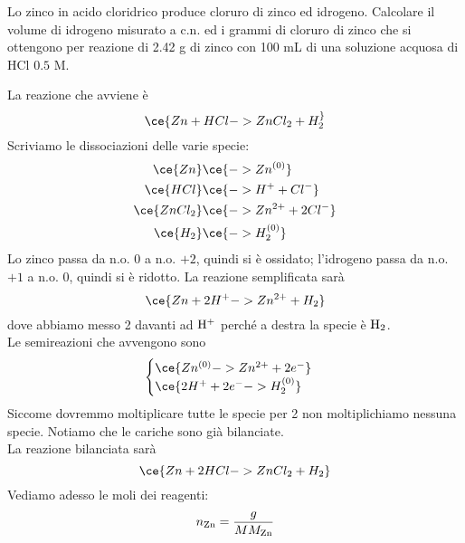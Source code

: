 \begin{esercizio}
    Lo zinco in acido cloridrico produce cloruro di zinco ed idrogeno. Calcolare il volume di idrogeno misurato a c.n. ed i grammi di cloruro di zinco che si ottengono per reazione di 2.42 g di zinco con 100 mL di una soluzione acquosa di HCl $0.5$ M.
\end{esercizio}
\begin{soluzione}
    La reazione che avviene è
    \begin{equation*}
        \ce{Zn + HCl -> ZnCl_2 + H_2 ^}
    \end{equation*}
    Scriviamo le dissociazioni delle varie specie:
    \begin{equation*}
        \begin{split}
            \ce{Zn} & \ce{-> Zn^{(0)}}
            \\
            \ce{HCl} & \ce{-> H^+ + Cl^-}
            \\
            \ce{ZnCl_2} & \ce{-> Zn^{2+} + 2Cl^-}
            \\
            \ce{H_2} & \ce{-> H_2^{(0)}}
        \end{split}
    \end{equation*}
    Lo zinco passa da n.o. $0$ a n.o. $+2$, quindi si è ossidato; l'idrogeno passa da n.o. $+1$ a n.o. $0$, quindi si è ridotto. La reazione semplificata sarà
    \begin{equation*}
        \ce{Zn + 2H^+ -> Zn^{2+} + H_2}
    \end{equation*}
    dove abbiamo messo 2 davanti ad $\rm H^+$ perché a destra la specie è $\rm H_2$.\\
    Le semireazioni che avvengono sono
    \begin{equation*}
        \begin{cases}
            \ce{Zn^{(0)} -> Zn^{2+} + 2e^-}\\
            \ce{2H^+ + 2e^- -> H_2^{(0)}}
        \end{cases}
    \end{equation*}
    Siccome dovremmo moltiplicare tutte le specie per 2 non moltiplichiamo nessuna specie. Notiamo che le cariche sono già bilanciate.\\
    La reazione bilanciata sarà
    \begin{equation*}
        \ce{Zn + 2HCl -> ZnCl_2 + H_2}
    \end{equation*}
    Vediamo adesso le moli dei reagenti:
    \begin{equation*}
        n_{\rm Zn}
        =\frac{g}{MM_{\rm Zn}}

\end{equation*}
\end{soluzione}
